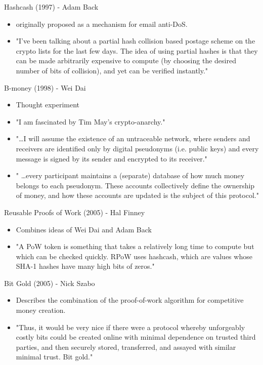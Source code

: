 \documentclass[]{beamer}
\begin{document}
\begin{frame}{Hashcash (1997) - Adam Back}
	\begin{itemize}
		\item originally proposed as a mechanism for email anti-DoS.
		\item "I've been talking about a partial hash collision based postage scheme on the crypto lists for the last few days. The idea of using partial hashes is that they can be made arbitrarily expensive to compute (by choosing the desired number of bits of collision), and yet can be verified instantly."
	\end{itemize}
\end{frame}


\begin{frame}{B-money (1998) - Wei Dai}
	\begin{itemize}
		\item Thought experiment
		\item "I am fascinated by Tim May's crypto-anarchy."
		\item "\dots I will assume the existence of an untraceable network, where senders and receivers are identified only by digital pseudonyms (i.e. public keys) and every message is signed by its sender and encrypted to its receiver."
		\item " \dots every participant maintains a (separate) database of how much money belongs to each pseudonym. These accounts collectively define the ownership of money, and how these accounts are updated is the subject of this protocol."
	\end{itemize}
\end{frame}


\begin{frame}{Reusable Proofs of Work (2005) - Hal Finney}
	\begin{itemize}
		\item Combines ideas of Wei Dai and Adam Back
		\item "A PoW token is something that takes a relatively long time to compute but which can be checked quickly. RPoW uses hashcash, which are values whose SHA-1 hashes have many high bits of zeros."
	\end{itemize}
\end{frame}


\begin{frame}{Bit Gold (2005) - Nick Szabo}
	\begin{itemize}
		\item Describes the combination of the proof-of-work algorithm for competitive money creation.
		\item "Thus, it would be very nice if there were a protocol whereby unforgeably costly bits could be created online with minimal dependence on trusted third parties, and then securely stored, transferred, and assayed with similar minimal trust. Bit gold."
	\end{itemize}
\end{frame}
\end{document}
